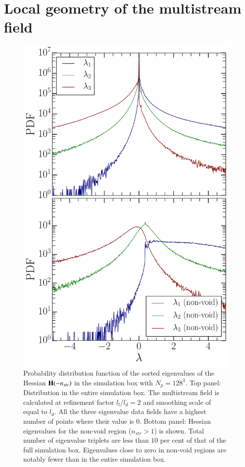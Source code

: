 \section{Local geometry of the multistream field}
\label{sec:hessian}
\begin{figure}
\begin{minipage}[t]{.99\linewidth}
  \centering\includegraphics[width=10.cm]{Chapter4/Source_v2/fig6.pdf} 

\end{minipage}\hfill
\caption{Probability distribution function of the sorted eigenvalues of the Hessian ${\bf H}(-n_{str})$ in the simulation box with $N_p = 128^3$. Top panel: Distribution in the entire simulation box. The multistream field is calculated at refinement factor $l_l/l_d= 2$ and smoothing scale of equal to $l_d$. All the three eigenvalue data fields have a highest number of points where their value is 0. Bottom panel: Hessian eigenvalues for the non-void region ($n_{str} > 1$) is shown. Total number of eigenvalue triplets are less than $10$ per cent of that of the full simulation box. Eigenvalues close to zero in non-void regions are notably fewer than in the entire simulation box.}
\label{fig:lambdasPDF}
\end{figure}


